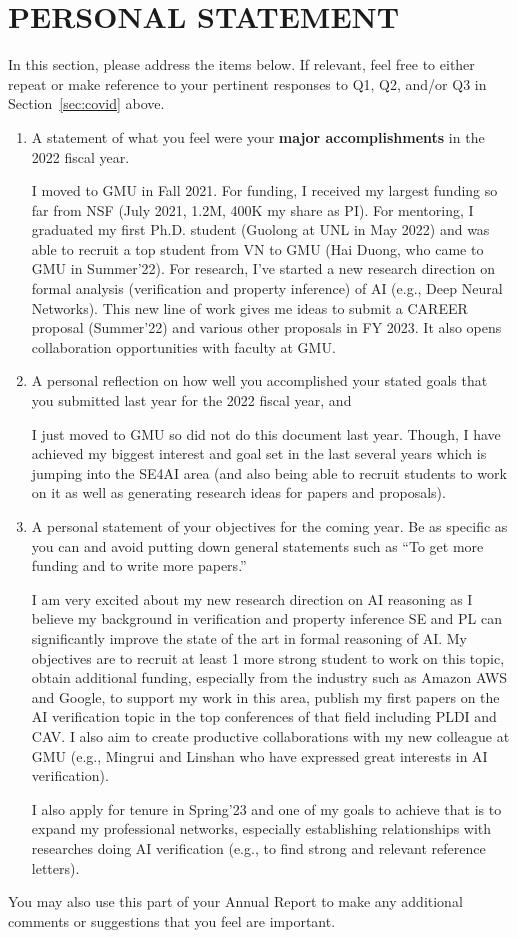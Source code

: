 \documentclass[11pt]{article}
\newcommand{\fy}{2022}
\begin{document}
\newpage
\section{PERSONAL STATEMENT}

In this section, please address the items below. If relevant, feel free
to either repeat or make reference to your pertinent responses to Q1,
Q2, and/or Q3 in Section~\ref{sec:covid} above.

\begin{enumerate}
\item
  A statement of what you feel were your \textbf{major accomplishments}
  in the \fy{} fiscal year.

  I moved to GMU in Fall 2021. For funding, I received my largest funding so far from NSF (July 2021, 1.2M, 400K my share as PI). For mentoring, I graduated my first Ph.D. student (Guolong at UNL in May 2022) and was able to recruit a top student from VN to GMU (Hai Duong, who came to GMU in Summer'22). For research, I've started a new research direction on formal analysis (verification and property inference) of AI (e.g., Deep Neural Networks). This new line of work gives me ideas to submit a CAREER proposal (Summer'22) and various other proposals in FY 2023. It also opens collaboration opportunities with faculty at GMU.
  
\item
  A personal reflection on how well you accomplished your stated goals
  that you submitted last year for the \fy{} fiscal year, and

  I just moved to GMU so did not do this document last year. Though, I have achieved my biggest interest and goal set in the last several years which is jumping into the SE4AI area (and also being able to recruit students to work on it as well as generating research ideas for papers and proposals).

\item
  A personal statement of your objectives for the coming year. Be as
  specific as you can and avoid putting down general statements such as
  ``To get more funding and to write more papers.''

  I am very excited about my new research direction on AI reasoning as I believe my background in verification and property inference SE and PL can significantly improve the state of the art in formal reasoning of AI.  My objectives are to recruit at least 1 more strong student to work on this topic, obtain additional funding, especially from the industry such as Amazon AWS and Google, to support my work in this area, publish my first papers on the AI verification topic in the top conferences of that field including PLDI and CAV. I also aim to create productive collaborations with my new colleague at GMU (e.g., Mingrui and Linshan who have expressed great interests in AI verification).

  I also apply for tenure in Spring'23 and one of my goals to achieve that is to expand my professional networks, especially establishing relationships with researches doing AI verification (e.g., to find strong and relevant reference letters).
  
\end{enumerate}

You may also use this part of your Annual Report to make any additional
comments or suggestions that you feel are important.
\end{document}
